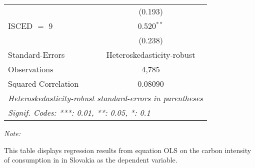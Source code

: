 \begin{table}[htbp!]
\begin{adjustbox}{width = 1\textwidth, max height = 0.95\textheight, center}
\begin{threeparttable}[b]
\begin{tabular}{lc}
                                & (0.193)\\   
            ISCED $=$ 9         & 0.520$^{**}$\\   
                                & (0.238)\\   
            \midrule 
            Standard-Errors     & Heteroskedasticity-robust \\   
            Observations        & 4,785\\  
            Squared Correlation & 0.08090\\  
            \midrule \midrule
            \multicolumn{2}{l}{\emph{Heteroskedasticity-robust standard-errors in parentheses}}\\
            \multicolumn{2}{l}{\emph{Signif. Codes: ***: 0.01, **: 0.05, *: 0.1}}\\
         \end{tabular}
         
         \begin{tablenotes}\item \medskip \textit{Note:}
            \item This table displays regression results from equation OLS on the carbon intensity of consumption in  in Slovakia as the dependent variable. 
         \end{tablenotes}
      \end{threeparttable}
   \end{adjustbox}
\end{table}



